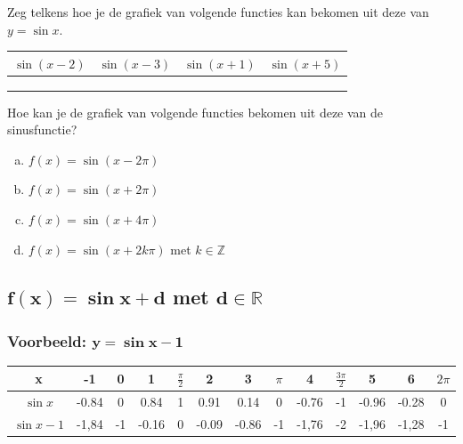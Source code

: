 \documentclass[a4paper,12pt]{article}
\begin{document}
\begin{oefening}
Zeg telkens hoe je de grafiek van volgende functies kan bekomen uit deze van $y=\sin x$.
\begin{center}
  \begin{tabular}{c|c|c|c}
    $\sin (x-2)$ & $\sin (x-3)$ & $\sin (x+1)$ & $\sin (x+5)$\\
    \hline
    \hspace*{3cm} &\hspace*{3cm}&\hspace*{3cm}&\hspace*{3cm}
    \\
    &&&
    \\
    &&&
  \end{tabular}
\end{center}
\end{oefening}

\begin{oefening}
Hoe kan je de grafiek van volgende functies bekomen uit deze van de sinusfunctie?
\begin{enumerate}[(a)]
  \item $f(x)=\sin(x-2\pi)$
  \item $f(x)=\sin(x+2\pi)$
  \item $f(x)=\sin(x+4\pi)$
  \item $f(x)=\sin(x+2k\pi)$ met $k\in\mathbb{Z}$
\end{enumerate}
\end{oefening}

\subsection{$\boldsymbol{f(x)=\sin x + d}$ met $\boldsymbol{d\in \mathbb{R}}$} 
\subsubsection{Voorbeeld: $\boldsymbol{y=\sin x-1}$}
\begin{adjustwidth}{-2.5cm}{-2.5cm}
\begin{center}
\scriptsize
  \begin{tabular}{c|c|c|c|c|c|c|c|c|c|c|c|c}
    x & -1 & 0 & 1 &  $\frac{\pi}{2}$ & 2 & 3 & $\pi$ & 4 & $\frac{3\pi}{2}$ & 5 & 6 & $2\pi$
    \\
    \hline
   $\sin x$ &-0.84&0&0.84&1&0.91&0.14&0&-0.76&-1&-0.96&-0.28 &0
    \\
    \hline
   $\sin x-1$ &-1,84& -1& -0.16& 0& -0.09& -0.86& -1& -1,76& -2& -1,96& -1,28 &-1
  \end{tabular}
\end{center}
\end{adjustwidth}
\end{document}
